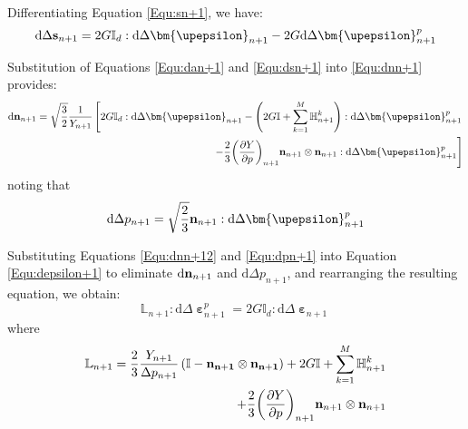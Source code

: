 Differentiating Equation \ref{Equ:sn+1}, we have:
\begin{equation}
\label{Equ:dsn+1}
{\text{d}}\Delta {{\bf{s}}_{n + 1}} = 2G{\mathbb{I}_d}:{\text{d}}\Delta {{\bm{\upepsilon }}_{n + 1}} - 2G{\text{d}}\Delta {\bm{\upepsilon }}_{n + 1}^p
\end{equation}

Substitution of Equations \ref{Equ:dan+1} and \ref{Equ:dsn+1} into \ref{Equ:dnn+1} provides:
\begin{equation}
\label{Equ:dnn+12}
\begin{aligned}
{\text{d}}{{\bf{n}}_{n + 1}} = \sqrt {\frac{3}{2}} \frac{1}{{{Y_{n + 1}}}} \left[ {2G{\mathbb{I}_d}:{\text{d}}\Delta {{\bm{\upepsilon }}_{n + 1}} - \left( {2G\mathbb{I} + \sum\limits_{k = 1}^M {\mathbb{H}_{n + 1}^k} } \right):{\text{d}}\Delta {\bm{\upepsilon }}_{n + 1}^p} \right.\\
\left. { - \frac{2}{3}{{\left( {\frac{{\partial Y}}{{\partial p}}} \right)}_{n + 1}}{{\bf{n}}_{n + 1}} \otimes {{\bf{n}}_{n + 1}}:{\text{d}}\Delta {\bm{\upepsilon }}_{n + 1}^p}\right]
\end{aligned}
\end{equation}
noting that
\begin{equation}
\label{Equ:dpn+1}
{\text{d}}\Delta {p_{n + 1}} = \sqrt {\frac{2}{3}} {{\bf{n}}_{n + 1}}:{\text{d}}\Delta {\bm{\upepsilon }}_{n + 1}^p
\end{equation}

Substituting Equations \ref{Equ:dnn+12} and \ref{Equ:dpn+1} into Equation \ref{Equ:depsilon+1} to eliminate ${\text{d}}{{\bf{n}}_{n + 1}}$ and ${\text{d}}\Delta {p_{n + 1}}$, and rearranging the resulting equation, we obtain:
\begin{equation}
{\mathbb{L}_{n + 1}}:{\text{d}}\Delta {\bm{\upepsilon }}_{n + 1}^p = 2G{\mathbb{I}_d}:{\text{d}}\Delta {{\bm{\upepsilon }}_{n + 1}}
\end{equation}
where
\begin{equation}
\label{Equ:Ln+1}
\begin{aligned}
\mathbb{L}_{n + 1} = \frac{2}{3}\frac{Y_{n + 1}}{\Delta {p_{n + 1}}} \left( \mathbb{I} - \bf{n}_{n + 1} \otimes \bf{n}_{n + 1} \right) + 2G\mathbb{I} + \sum \limits_{k = 1}^M {\mathbb{H}_{n + 1}^k} \\
   + \frac{2}{3}{{\left( {\frac{{\partial Y}}{{\partial p}}} \right)}_{n + 1}}{{\bf{n}}_{n + 1}} \otimes {{\bf{n}}_{n + 1}}
\end{aligned}
\end{equation}

